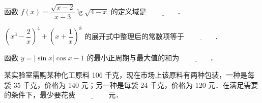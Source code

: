 \begin{question}
函数 $f(x) = \dfrac{\sqrt{x - 2}}{x - 3}\lg\sqrt{4 - x}$ 的定义域是 $\underline{\qquad\qquad}$．

\end{question}
\begin{question}
$\left(x^3 - \dfrac{2}{x}\right)^4 + \left(x + \dfrac{1}{x}\right)^8$ 的展开式中整理后的常数项等于 $\underline{\qquad\qquad}$．

\end{question}
\begin{question}
函数 $y = |\sin x|\cos x - 1$ 的最小正周期与最大值的和为 $\underline{\qquad\qquad}$．

\end{question}
\begin{question}
某实验室需购某种化工原料 106 千克，现在市场上该原料有两种包装，一种是每袋 35 千克，价格为 140 元；另一种是每袋 24 千克，价格为 120 元．在满足需要的条件下，最少要花费 $\underline{\qquad\qquad}$ 元．

\end{question}

